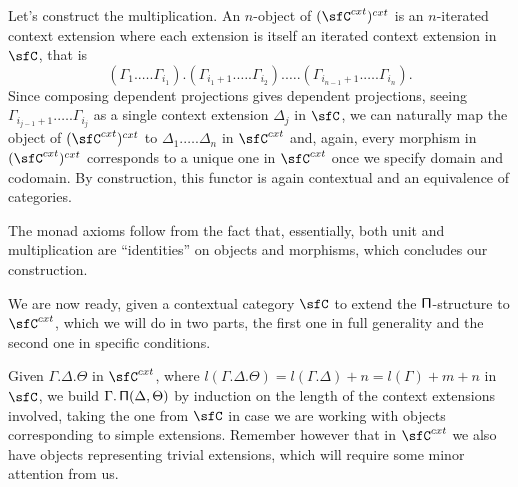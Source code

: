\begin{construction}
  Let's construct the multiplication. An $n$-object of $(\sfC^{cxt})^{cxt}$ is an
  $n$-iterated context extension where each extension is itself an iterated
  context extension in $\sfC$, that is
  \[(\Gamma_1.\ldots.\Gamma_{i_1}).(\Gamma_{i_1+1}.\ldots.\Gamma_{i_2}).\ldots.(\Gamma_{i_{n-1}+1}.\ldots.\Gamma_{i_n}).\]
  Since composing dependent projections gives dependent projections,
  seeing $\Gamma_{i_{j-1}+1}.\ldots.\Gamma_{i_j}$ as a single context extension
  $\Delta_j$ in $\sfC$, we can naturally
  map the object of $(\sfC^{cxt})^{cxt}$ to $\Delta_1.\ldots.\Delta_n$ in
  $\sfC^{cxt}$ and, again, every morphism
  in $(\sfC^{cxt})^{cxt}$ corresponds to a unique one in $\sfC^{cxt}$ once we
  specify domain and codomain. By construction, this functor is again contextual
  and an equivalence of categories.

  The monad axioms follow from the fact that, essentially, both unit and
  multiplication are ``identities'' on objects and morphisms, which concludes
  our construction.
\end{construction}

We are now ready, given a contextual category $\sfC$ to extend the
$\operatorname{\mathsf{\Pi}}$-structure to $\sfC^{cxt}$, which we will do in two parts,
the first one in full generality and the second one in specific conditions.

Given $\Gamma.\Delta.\Theta$ in $\sfC^{cxt}$, where
$l(\Gamma.\Delta.\Theta)=l(\Gamma.\Delta)+n=l(\Gamma)+m+n$ in $\sfC$, we
build $\Gamma.\operatorname{\mathsf{\Pi}}(\Delta,\Theta)$ by induction on the length of the context
extensions involved, taking the
one from $\sfC$ in case we are working with objects corresponding to simple
extensions. Remember however that in $\sfC^{cxt}$ we also have objects
representing trivial extensions, which will require some minor attention from
us.

